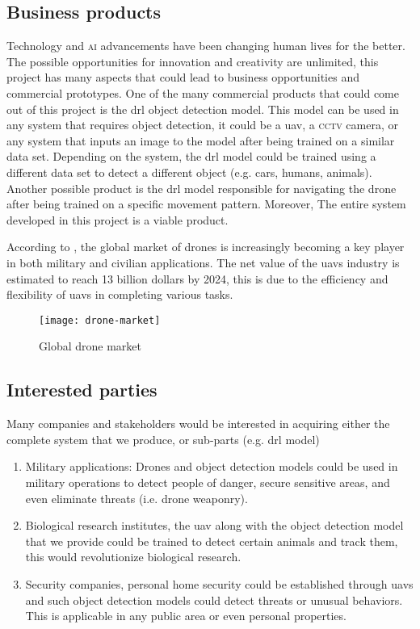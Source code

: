 \documentclass[../main.tex]{subfiles}
\begin{document}
\subsection{Business products}
        Technology and \textsc{ai} advancements have been changing human lives for the better.
	The possible opportunities for innovation and creativity are unlimited, this
	project has many aspects that could lead to business opportunities and commercial
	prototypes. 
	One of the many commercial products that could come out of this project is
	the \gls{drl} object detection model. This model can be used in any system
	that requires object detection, it could be a \gls{uav}, a \textsc{cctv} camera, or
	any system that inputs an image to the model after being trained on a similar 
	data set.
	Depending on the system, the \gls{drl} model could be trained using a different
	data set to detect a different object (e.g. cars, humans, animals).
	Another possible product is the \gls{drl} model responsible for navigating the
	drone after being trained on a specific movement pattern.
	Moreover, The entire system developed in this project is a viable product.
	
	According to \citeauthor{Atwater15Commercial}, the global market of drones is 
	increasingly becoming a key player in both military and civilian applications.
	The net value of the \glspl{uav} industry is estimated to reach 13 billion dollars
	by 2024, this is due to the efficiency and flexibility of \glspl{uav} in completing 
	various tasks.
	
	\begin{figure}[H] 
		\centering
		\texttt{[image: drone-market]} 
		\caption{Global drone market} \label{fig:drone-market} 
	\end{figure}
	
	
\subsection{Interested parties}
	Many companies and stakeholders would be interested in acquiring either the
	complete system that we produce, or sub-parts (e.g. \gls{drl} model)
	\begin{enumerate}
		\item Military applications: Drones and object detection models could 
		be used in military operations to detect people of danger, secure 
		sensitive areas, and even eliminate threats (i.e. drone weaponry).
		
		\item Biological research institutes, the \gls{uav} along with the object
		detection model that we provide could be trained to detect certain animals 
		and track them, this would revolutionize biological research.
		
		\item Security companies, personal home security could be established through
		\glspl{uav} and such object detection models could detect threats or unusual
		behaviors. This is applicable in any public area or even personal properties.		
		
	\end{enumerate}
\end{document}
